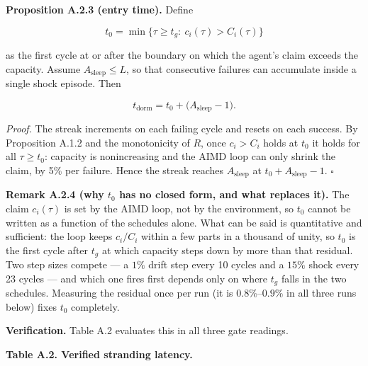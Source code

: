 \documentclass[11pt,a4paper]{article}
\begin{document}
\textbf{Proposition A.2.3 (entry time).} Define

\[
t_0=\min\Big\{\tau\ge t_g:\ c_i(\tau)>C_i(\tau)\Big\}
\]

as the first cycle at or after the boundary on which the agent's claim exceeds the
capacity. Assume \(A_{\mathrm{sleep}}\le L\), so that consecutive failures can
accumulate inside a single shock episode. Then

\[
t_{\mathrm{dorm}}=t_0+\big(A_{\mathrm{sleep}}-1\big).
\]

\emph{Proof.} The streak increments on each failing cycle and resets on each success.
By Proposition A.1.2 and the monotonicity of \(R\), once \(c_i>C_i\) holds at \(t_0\) it
holds for all \(\tau\ge t_0\): capacity is nonincreasing and the AIMD loop can only
shrink the claim, by 5\% per failure. Hence the streak reaches
\(A_{\mathrm{sleep}}\) at \(t_0+A_{\mathrm{sleep}}-1\). \(\square\)

\textbf{Remark A.2.4 (why \(t_0\) has no closed form, and what replaces it).} The claim
\(c_i(\tau)\) is set by the AIMD loop, not by the environment, so \(t_0\) cannot be
written as a function of the schedules alone. What can be said is quantitative and
sufficient: the loop keeps \(c_i/C_i\) within a few parts in a thousand of unity, so
\(t_0\) is the first cycle after \(t_g\) at which capacity steps down by more than that
residual. Two step sizes compete --- a \(1\%\) drift step every 10 cycles and a \(15\%\)
shock every 23 cycles --- and which one fires first depends only on where \(t_g\) falls
in the two schedules. Measuring the residual once per run (it is \(0.8\%\)--\(0.9\%\)
in all three runs below) fixes \(t_0\) completely.

\textbf{Verification.} Table A.2 evaluates this in all three gate readings.

\textbf{Table A.2. Verified stranding latency.}
\end{document}
